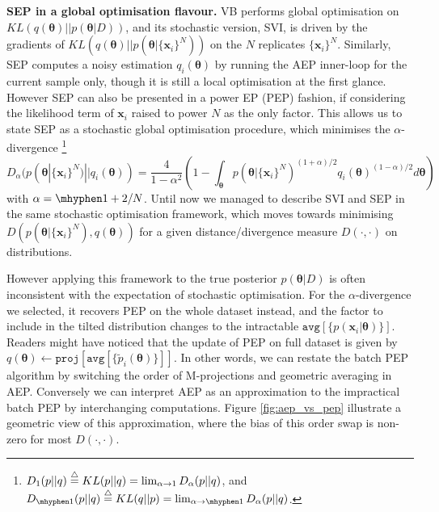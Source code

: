 %
\textbf{SEP in a global optimisation flavour.}
VB performs global optimisation on $KL(q(\bm{\theta})||p(\bm{\theta}|D))$, and its stochastic version, SVI, is driven by the gradients of $KL(q(\bm{\theta}) || p(\bm{\theta} | \{\bm{x}_i\}^N))$ on the $N$ replicates $\{\bm{x}_i\}^N$. Similarly, SEP computes a noisy estimation $q_i(\bm{\theta})$ by running the AEP inner-loop for the current sample only, though it is still a local optimisation at the first glance. However SEP can also be presented in a power EP (PEP) \cite{minka:powerep} fashion, if considering the likelihood term of $\bm{x}_i$ raised to power $N$ as the only factor. This allows us to state SEP as a stochastic global optimisation procedure, which minimises the $\alpha$-divergence \footnote{$D_{1}(p||q) \buildrel\triangle\over = KL(p || q) = \lim_{\alpha \rightarrow 1} D_{\alpha}(p||q)$, and $D_{ \mhyphen 1}(p||q) \buildrel\triangle\over = KL(q || p) = \lim_{\alpha \rightarrow \mhyphen 1} D_{\alpha}(p || q)$. } \cite{amari:ig1985}
\begin{equation}
D_{\alpha}(p(\bm{\theta} | \{\bm{x}_i\}^N) || q_i(\bm{\theta})) = \frac{4}{1 - \alpha^2} 
		\left( 1 - \int_{\bm{\theta}} p(\bm{\theta} | \{\bm{x}_i\}^N)^{(1 + \alpha) / 2} q_i(\bm{\theta})^{(1 - \alpha) / 2} d\bm{\theta} \right)
\end{equation} 
with $\alpha = \mhyphen 1 + 2/N$. Until now we managed to describe SVI and SEP in the same stochastic optimisation framework, which moves towards minimising $D(p(\bm{\theta} | \{\bm{x}_i\}^N), q(\bm{\theta}))$ for a given distance/divergence measure $D(\cdot, \cdot)$ on distributions. 

%
However applying this framework to the true posterior $p(\bm{\theta}|D)$ is often inconsistent with the expectation of stochastic optimisation. For the $\alpha$-divergence we selected, it recovers PEP on the whole dataset instead, and the factor to include in the tilted distribution changes to the intractable $\mathtt{avg}[\{p(\bm{x}_i | \bm{\theta}) \}]$. Readers might have noticed that the update of PEP on full dataset is given by $q(\bm{\theta}) \leftarrow \mathtt{proj}[\mathtt{avg}[\{ \tilde{p}_i(\bm{\theta}) \}]]$. In other words, we can restate the batch PEP algorithm by switching the order of M-projections and geometric averaging in AEP. Conversely we can interpret AEP as an approximation to the impractical batch PEP by interchanging computations. Figure \ref{fig:aep_vs_pep} illustrate a geometric view of this approximation, where the bias of this order swap is non-zero for most $D(\cdot, \cdot)$.

